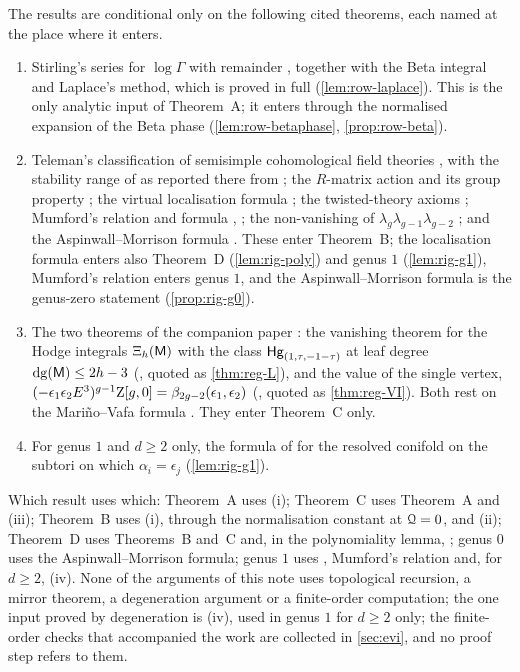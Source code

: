 The results are conditional only on the following cited theorems, each named at the place where it enters.
\begin{enumerate}
\item Stirling's series for $\log\Gamma$ with remainder \cite[5.11.1 and Section~5.11(ii)]{DLMF}, together with the Beta integral \cite[5.12.1]{DLMF} and Laplace's method, which is proved in full (\cref{lem:row-laplace}). This is the only analytic input of Theorem~A; it enters through the normalised expansion of the Beta phase (\cref{lem:row-betaphase}, \cref{prop:row-beta}).
\item Teleman's classification of semisimple cohomological field theories \cite[Theorem~(2), (1.15), Prop.~8.7(ii)]{Tel12}, with the stability range of \cite[2.17--2.19, (2.15)]{Tel12} as reported there from \cite{Loo96,MW07,Har85,Iva90}; the $R$-matrix action and its group property \cite[Defs.~2.2, 2.13, Prop.~2.14]{PPZ15}; the virtual localisation formula \cite{GP99}; the twisted-theory axioms \cite[App.~1]{CG07}; Mumford's relation and formula \cite{Mum83}, \cite[Section~1.1]{FP00}; the non-vanishing of $\lambda_g\lambda_{g-1}\lambda_{g-2}$ \cite[Theorem~4]{FP00}; and the Aspinwall--Morrison formula \cite[p.~3]{FP00}. These enter Theorem~B; the localisation formula \cite{GP99} enters also Theorem~D (\cref{lem:rig-poly}) and genus $1$ (\cref{lem:rig-g1}), Mumford's relation enters genus $1$, and the Aspinwall--Morrison formula is the genus-zero statement (\cref{prop:rig-g0}). 
\item The two theorems of the companion paper \cite{LP2}: the vanishing theorem for the Hodge integrals $\Xi_h(\mathsf{M})$ with the class $\mathsf{Hg}_{(1,\tau,-1-\tau)}$ at leaf degree $\mathrm{dg}(\mathsf{M})\leq2h-3$ (\cite[Theorem~8.1, Corollaries~8.2--8.4]{LP2}, quoted as \cref{thm:reg-L}), and the value of the single vertex, $(-\epsilon_1\epsilon_2E^3)^{g-1}\mathrm{Z}[g,0]=\beta_{2g-2}(\epsilon_1,\epsilon_2)$ (\cite[Theorem~9.1]{LP2}, quoted as \cref{thm:reg-VI}). Both rest on the Mari\~no--Vafa formula \cite[(1)--(3)]{LLZ03}. They enter Theorem~C only.
\item For genus $1$ and $d\geq2$ only, the formula of \cite{BS} for the resolved conifold on the subtori on which $\alpha_i=\epsilon_j$ (\cref{lem:rig-g1}). 
\end{enumerate}
Which result uses which: Theorem~A uses (i); Theorem~C uses Theorem~A and (iii); Theorem~B uses (i), through the normalisation constant at $\mathcal{Q}=0$, and (ii); Theorem~D uses Theorems~B and~C and, in the polynomiality lemma, \cite{GP99}; genus $0$ uses the Aspinwall--Morrison formula; genus $1$ uses \cite{GP99}, Mumford's relation and, for $d\geq2$, (iv). None of the arguments of this note uses topological recursion, a mirror theorem, a degeneration argument or a finite-order computation; the one input proved by degeneration is (iv), used in genus $1$ for $d\geq2$ only; the finite-order checks that accompanied the work are collected in \cref{sec:evi}, and no proof step refers to them.


